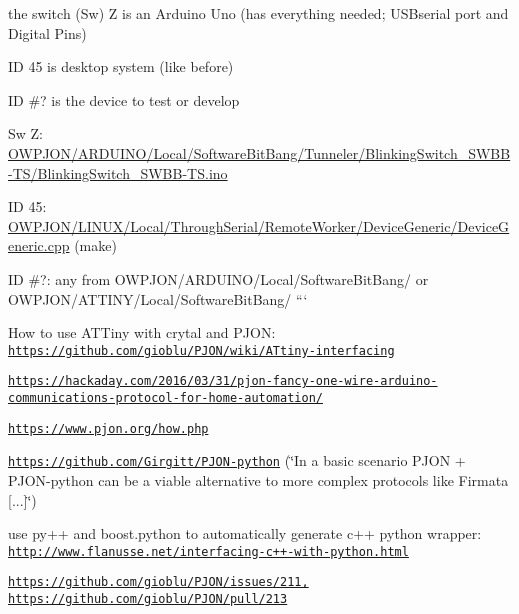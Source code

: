 \begin{DoxyItemize}
\item the switch (Sw) Z is an Arduino Uno (has everything needed; U\-S\-Bserial port and Digital Pins)
\item I\-D 45 is desktop system (like before)
\item I\-D \#? is the device to test or develop
\item Sw Z\-: \hyperlink{BlinkingSwitch__SWBB-TS_8ino}{O\-W\-P\-J\-O\-N/\-A\-R\-D\-U\-I\-N\-O/\-Local/\-Software\-Bit\-Bang/\-Tunneler/\-Blinking\-Switch\-\_\-\-S\-W\-B\-B-\/\-T\-S/\-Blinking\-Switch\-\_\-\-S\-W\-B\-B-\/\-T\-S.\-ino}
\item I\-D 45\-: \hyperlink{ThroughSerial_2RemoteWorker_2DeviceGeneric_2DeviceGeneric_8cpp}{O\-W\-P\-J\-O\-N/\-L\-I\-N\-U\-X/\-Local/\-Through\-Serial/\-Remote\-Worker/\-Device\-Generic/\-Device\-Generic.\-cpp} (make)
\item I\-D \#?\-: any from O\-W\-P\-J\-O\-N/\-A\-R\-D\-U\-I\-N\-O/\-Local/\-Software\-Bit\-Bang/ or O\-W\-P\-J\-O\-N/\-A\-T\-T\-I\-N\-Y/\-Local/\-Software\-Bit\-Bang/ ```
\item How to use A\-T\-Tiny with crytal and P\-J\-O\-N\-: \href{https://github.com/gioblu/PJON/wiki/ATtiny-interfacing}{\tt https\-://github.\-com/gioblu/\-P\-J\-O\-N/wiki/\-A\-Ttiny-\/interfacing}
\item \href{https://hackaday.com/2016/03/31/pjon-fancy-one-wire-arduino-communications-protocol-for-home-automation/}{\tt https\-://hackaday.\-com/2016/03/31/pjon-\/fancy-\/one-\/wire-\/arduino-\/communications-\/protocol-\/for-\/home-\/automation/}
\item \href{https://www.pjon.org/how.php}{\tt https\-://www.\-pjon.\-org/how.\-php}
\item \href{https://github.com/Girgitt/PJON-python}{\tt https\-://github.\-com/\-Girgitt/\-P\-J\-O\-N-\/python} (\char`\"{}\-In a basic scenario P\-J\-O\-N + P\-J\-O\-N-\/python can be a viable alternative to more complex protocols like Firmata \mbox{[}...\mbox{]}\char`\"{})
\begin{DoxyItemize}
\item use py++ and boost.\-python to automatically generate c++ python wrapper\-: \href{http://www.flanusse.net/interfacing-c++-with-python.html}{\tt http\-://www.\-flanusse.\-net/interfacing-\/c++-\/with-\/python.\-html}
\end{DoxyItemize}
\item \href{https://github.com/gioblu/PJON/issues/211,}{\tt https\-://github.\-com/gioblu/\-P\-J\-O\-N/issues/211,} \href{https://github.com/gioblu/PJON/pull/213}{\tt https\-://github.\-com/gioblu/\-P\-J\-O\-N/pull/213}

\end{DoxyItemize}

